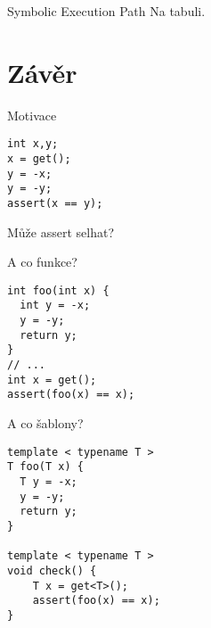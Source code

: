 \documentclass[11pt]{beamer}
\begin{document}
\begin{frame}{Symbolic Execution Path}
Na tabuli.
\end{frame}

\section{Závěr}


\begin{frame}[fragile]{Motivace}

\begin{lstlisting}
int x,y;
x = get();
y = -x;
y = -y;
assert(x == y);
\end{lstlisting}

Může assert selhat?

\end{frame}


\begin{frame}[fragile]{A co funkce?}
\begin{lstlisting}
int foo(int x) {
  int y = -x;
  y = -y;
  return y;
}
// ...
int x = get();
assert(foo(x) == x);
\end{lstlisting}
\end{frame}


\begin{frame}[fragile]{A co šablony?}
\begin{lstlisting}
template < typename T >
T foo(T x) {
  T y = -x;
  y = -y;
  return y;
}

template < typename T >
void check() {
    T x = get<T>();
    assert(foo(x) == x);
}
\end{lstlisting}
\end{frame}
\end{document}
